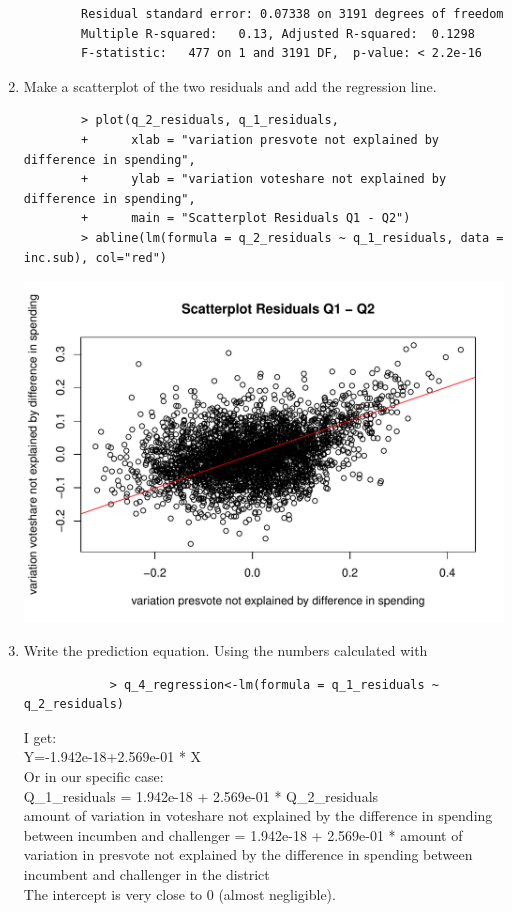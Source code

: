 \documentclass[12pt,letterpaper]{article}
\begin{document}
\begin{enumerate}
\begin{verbatim}
		Residual standard error: 0.07338 on 3191 degrees of freedom
		Multiple R-squared:   0.13,	Adjusted R-squared:  0.1298 
		F-statistic:   477 on 1 and 3191 DF,  p-value: < 2.2e-16
	\end{verbatim}
		\item Make a scatterplot of the two residuals and add the regression line. 	\\
		\begin{verbatim}
		> plot(q_2_residuals, q_1_residuals,
		+      xlab = "variation presvote not explained by difference in spending",
		+      ylab = "variation voteshare not explained by difference in spending",
		+      main = "Scatterplot Residuals Q1 - Q2")
		> abline(lm(formula = q_2_residuals ~ q_1_residuals, data = inc.sub), col="red")
	\end{verbatim}
	\includegraphics[width=\textwidth,height=\textheight,keepaspectratio]{Q_4_Plot}
		\item Write the prediction equation.
		Using the numbers calculated with
		\begin{verbatim}
			> q_4_regression<-lm(formula = q_1_residuals ~ q_2_residuals)
		\end{verbatim}
		I get: \\
		Y=-1.942e-18+2.569e-01 * X \\
		Or in our specific case: \\
		Q\_1\_residuals = 1.942e-18 + 2.569e-01 * Q\_2\_residuals \\
		amount of variation in voteshare not explained by the difference in spending between incumben and challenger = 1.942e-18 + 2.569e-01 * amount of variation in presvote not explained by the difference in spending between incumbent and challenger in the district \\
		The intercept is very close to 0 (almost negligible). 
	\end{enumerate}
	
\end{document}
